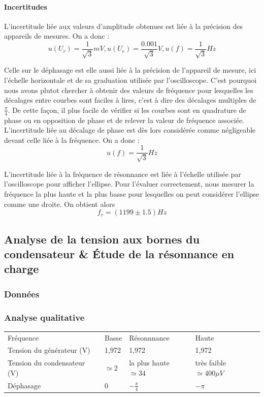 \documentclass[a4paper,9pt,french]{scrartcl}
\begin{document}
\paragraph{Incertitudes}
L'incertitude liée aux valeurs d'amplitude obtenues est liée à la précision des appareils de mesures. On a donc :
\[u(U_r) = \frac{1}{\sqrt{3}}mV, u(U_e) = \frac{0.001}{\sqrt{3}}V, u(f) = \frac{1}{\sqrt{3}}Hz\]

Celle sur le déphasage est elle aussi liée à la précision de l'appareil de mesure, ici l'échelle horizontale et de sa graduation utilisée par l'oscilloscope. C'est pourquoi nous avons plutot chercher à obtenir des valeurs de fréquence pour lesquelles les décalages entre courbes sont faciles à lires, c'est à dire des décalages multiples de \(\frac{\pi}{4}\). De cette façon, il plus facile de vérifier si les courbes sont en quadrature de phase ou en opposition de phase et de relever la valeur de fréquence associée. L'incertitude liée au décalage de phase est dès lors considérée comme négligeable devant celle liée à la fréquence. On a donc : \[u(f) = \frac{1}{\sqrt{3}}Hz\]

L'incertitude liée à la fréquence de résonnance est liée à l'échelle utilisée par l'oscilloscope pour afficher l'ellipse. Pour l'évaluer correctement, nous mesurer la fréquence la plus haute et la plus basse pour lesquelles on peut considérer l'ellipse comme une droite. On obtient alors \[f_r = (1199\pm1.5)Hz\]
\subsection{Analyse de la tension aux bornes du condensateur \& Étude de la résonnance en charge}
\subsubsection{Données}
\subsubsection{Analyse qualitative}
\begin{center}
\begin{tabular}{llll}
Fréquence & Basse & Résonnnance & Haute\\
Tension du générateur (V) & 1,972 & 1,972 & 1,972\\
Tension du condensateur (V) & \(\simeq 2 \) & la plus haute \(\simeq 34\) & très faible \(\simeq 400 \mu V\)\\
Déphasage & 0 & \(-\frac{\pi}{4}\) &  \(-\pi\)
\end{tabular}
\end{center}
\end{document}
